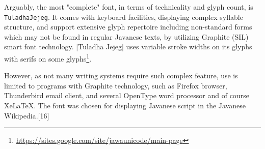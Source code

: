 Arguably, the most "complete" font, in terms of technicality and glyph count, is \texttt{TuladhaJejeg}. It comes with keyboard facilities, displaying complex syllable structure, and support extensive glyph repertoire including non-standard forms which may not be found in regular Javanese texts, by utilizing Graphite (SIL) smart font technology. |Tuladha Jejeg| uses variable stroke widths on its glyphs with serifs on some glyphs\footnote{\protect\url{https://sites.google.com/site/jawaunicode/main-page}}.

However, as not many writing systems require such complex feature, use is limited to programs with Graphite technology, such as Firefox browser, Thunderbird email client, and several OpenType word processor and of course XeLaTeX. The font was chosen for displaying Javanese script in the Javanese Wikipedia.[16]